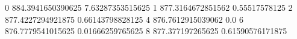 0 884.3941650390625 7.63287353515625
1 877.3164672851562 0.55517578125
2 877.4227294921875 0.66143798828125
4 876.7612915039062 0.0
6 876.7779541015625 0.01666259765625
8 877.377197265625 0.61590576171875
